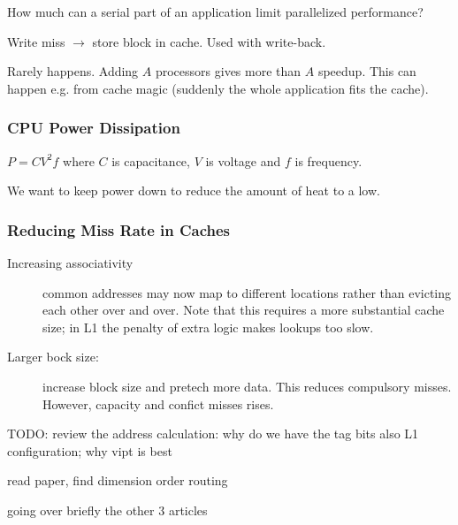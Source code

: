 \begin{definition}
    How much can a serial part of an application limit parallelized performance?
\end{definition}


\begin{definition}
    Write miss $\rightarrow$ store block in cache. Used with write-back.
\end{definition}



\begin{definition}
   Rarely happens. Adding $A$ processors gives more than $A$ speedup. This can happen e.g. from cache magic (suddenly the whole application fits the cache). 
\end{definition}


\subsubsection{CPU Power Dissipation}\label{sec:powerdissipation}
    $P = CV^{2}f$
    where $C$ is capacitance, $V$ is voltage and $f$ is frequency.

    We want to keep power down to reduce the amount of heat to a low.

\subsubsection{Reducing Miss Rate in Caches}
\begin{description}
    \item[Increasing associativity] common addresses may now map to different locations rather than evicting each other over and over. Note that this requires 
    a more substantial cache size; in L1 the penalty of extra logic makes lookups
    too slow.
    \item[Larger bock size:] increase block size and pretech more data. This
    reduces compulsory misses. However, capacity and confict misses rises.
\end{description}

TODO: review the address calculation: why do we have the tag bits
    also L1 configuration; why vipt is best

read paper, find dimension order routing

going over briefly the other 3 articles

